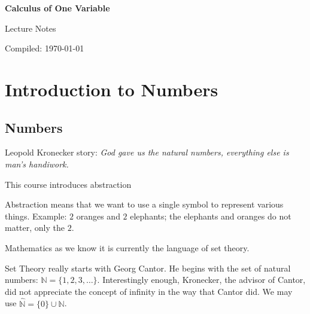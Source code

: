 \documentclass[12pt,oneside]{report}
\begin{document}
\begin{titlepage}
    \centering
    \vspace*{2cm}
    {\Huge\bfseries Calculus of One Variable\par}
    \vspace{1cm}
    {\Large Lecture Notes\par}
    \vspace{2cm}
    {\Large Compiled: \today\par}
\end{titlepage}

\tableofcontents
\newpage

\pagestyle{head}




\section{Introduction to Numbers}

\subsection{Numbers}

Leopold Kronecker story: \textit{God gave us the natural numbers, everything else is man's handiwork.}



This course introduces abstraction

\begin{definition}[Abstraction]
  Abstraction means that we want to use a single symbol to represent various things. Example: $2$ oranges and $2$ elephants; the elephants and oranges do not matter, only the $2$. 

\end{definition}

Mathematics as we know it is currently the language of set theory. 

Set Theory really starts with Georg Cantor. He begins with the set of natural numbers: \( \mathbb{N}=\{1,2,3,\ldots \} \). Interestingly enough, Kronecker, the advisor of Cantor, did not appreciate the concept of infinity in the way that Cantor did. We may use \( \hat{\mathbb{N}} =\{0\} \cup \mathbb{N}  \). 
\end{document}
